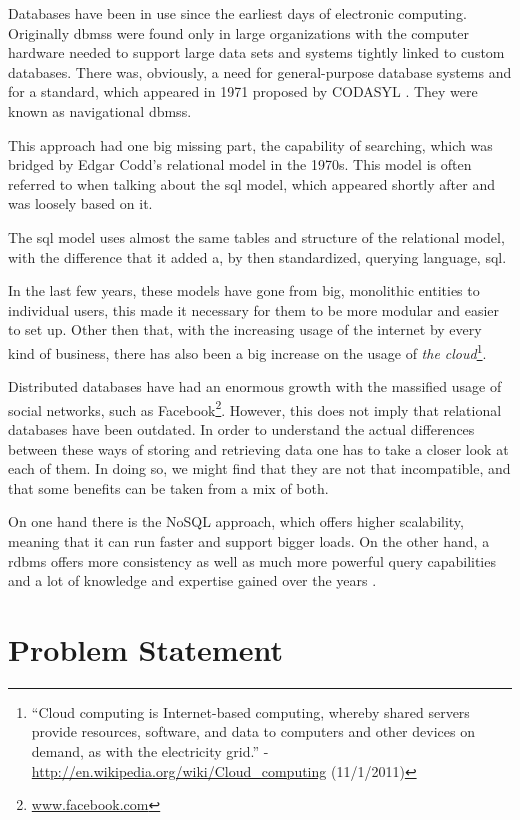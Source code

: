 Databases have been in use since the earliest days of electronic computing. Originally \ac{dbms}s were found only in large organizations with the computer hardware needed to support large data sets and systems tightly linked to custom databases. There was, obviously, a need for general-purpose database systems and for a standard, which appeared in 1971 proposed by CODASYL \cite{taylor1976codasyl}. They were known as navigational \ac{dbms}s.

This approach had one big missing part, the capability of searching, which was bridged by Edgar Codd's relational model \cite{codd1970relational} in the 1970s. This model is often referred to when talking about the \ac{sql} model, which appeared shortly after and was loosely based on it.

The \ac{sql} model uses almost the same tables and structure of the relational model, with the difference that it added a, by then standardized, querying language, \ac{sql}.

In the last few years, these models have gone from big, monolithic entities to individual users, this made it necessary for them to be more modular and easier to set up. Other then that, with the increasing usage of the internet by every kind of business, there has also been a big increase on the usage of \emph{the cloud}\footnote{``Cloud computing is Internet-based computing, whereby shared servers provide resources, software, and data to computers and other devices on demand, as with the electricity grid.'' - \url{http://en.wikipedia.org/wiki/Cloud_computing} (11/1/2011)}.

Distributed databases \cite{ozsu91distributeddatabase} have had an enormous growth with the massified usage of social networks, such as Facebook\footnote{\url{www.facebook.com}}. However, this does not imply that relational databases have been outdated. In order to understand the actual differences between these ways of storing and retrieving data one has to take a closer look at each of them. In doing so, we might find that they are not that incompatible, and that some benefits can be taken from a mix of both.

On one hand there is the NoSQL approach, which offers higher scalability, meaning that it can run faster and support bigger loads. On the other hand, a \ac{rdbms} offers more consistency as well as much more powerful query capabilities and a lot of knowledge and expertise gained over the years \cite{stonebraker2010sql}.


\section{Problem Statement}

